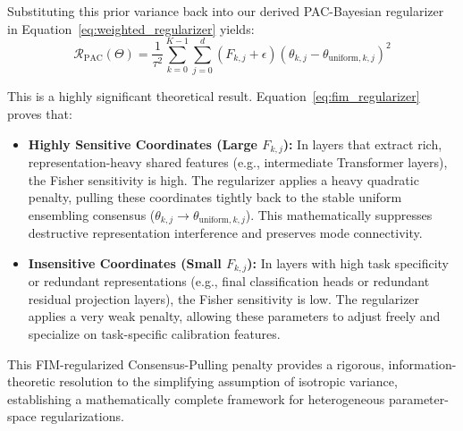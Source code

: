 Substituting this prior variance back into our derived PAC-Bayesian regularizer in Equation~\eqref{eq:weighted_regularizer} yields:
\begin{equation}
\label{eq:fim_regularizer}
\mathcal{R}_{\text{PAC}}(\Theta) = \frac{1}{\tau^2} \sum_{k=0}^{K-1} \sum_{j=0}^d \left( F_{k, j} + \epsilon \right) \left( \theta_{k, j} - \theta_{\text{uniform}, k, j} \right)^2
\end{equation}

This is a highly significant theoretical result. Equation~\eqref{eq:fim_regularizer} proves that:
\begin{itemize}
    \item \textbf{Highly Sensitive Coordinates (Large $F_{k, j}$):} In layers that extract rich, representation-heavy shared features (e.g., intermediate Transformer layers), the Fisher sensitivity is high. The regularizer applies a heavy quadratic penalty, pulling these coordinates tightly back to the stable uniform ensembling consensus ($\theta_{k, j} \to \theta_{\text{uniform}, k, j}$). This mathematically suppresses destructive representation interference and preserves mode connectivity.
    \item \textbf{Insensitive Coordinates (Small $F_{k, j}$):} In layers with high task specificity or redundant representations (e.g., final classification heads or redundant residual projection layers), the Fisher sensitivity is low. The regularizer applies a very weak penalty, allowing these parameters to adjust freely and specialize on task-specific calibration features.
\end{itemize}
This FIM-regularized Consensus-Pulling penalty provides a rigorous, information-theoretic resolution to the simplifying assumption of isotropic variance, establishing a mathematically complete framework for heterogeneous parameter-space regularizations.
